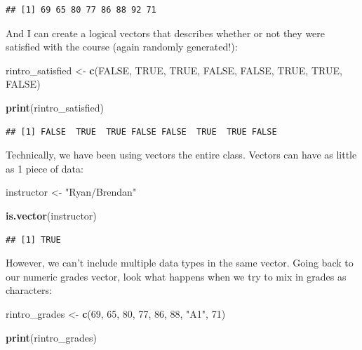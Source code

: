 \documentclass[
]{book}
\newenvironment{Shaded}{\begin{snugshade}}{\end{snugshade}}
\newcommand{\ConstantTok}[1]{\textcolor[rgb]{0.56,0.35,0.01}{#1}}
\newcommand{\DecValTok}[1]{\textcolor[rgb]{0.00,0.00,0.81}{#1}}
\newcommand{\FunctionTok}[1]{\textcolor[rgb]{0.13,0.29,0.53}{\textbf{#1}}}
\newcommand{\NormalTok}[1]{#1}
\newcommand{\OtherTok}[1]{\textcolor[rgb]{0.56,0.35,0.01}{#1}}
\newcommand{\StringTok}[1]{\textcolor[rgb]{0.31,0.60,0.02}{#1}}
\begin{document}
\begin{verbatim}
## [1] 69 65 80 77 86 88 92 71
\end{verbatim}

And I can create a logical vectors that describes whether or not they were satisfied with the course (again randomly generated!):

\begin{Shaded}
\begin{Highlighting}[]
\NormalTok{rintro\_satisfied }\OtherTok{\textless{}{-}} \FunctionTok{c}\NormalTok{(}\ConstantTok{FALSE}\NormalTok{, }\ConstantTok{TRUE}\NormalTok{, }\ConstantTok{TRUE}\NormalTok{, }\ConstantTok{FALSE}\NormalTok{, }\ConstantTok{FALSE}\NormalTok{, }\ConstantTok{TRUE}\NormalTok{, }\ConstantTok{TRUE}\NormalTok{, }\ConstantTok{FALSE}\NormalTok{) }

\FunctionTok{print}\NormalTok{(rintro\_satisfied)}
\end{Highlighting}
\end{Shaded}

\begin{verbatim}
## [1] FALSE  TRUE  TRUE FALSE FALSE  TRUE  TRUE FALSE
\end{verbatim}

Technically, we have been using vectors the entire class. Vectors can have as little as 1 piece of data:

\begin{Shaded}
\begin{Highlighting}[]
\NormalTok{instructor }\OtherTok{\textless{}{-}} \StringTok{"Ryan/Brendan"}

\FunctionTok{is.vector}\NormalTok{(instructor)}
\end{Highlighting}
\end{Shaded}

\begin{verbatim}
## [1] TRUE
\end{verbatim}

However, we can't include multiple data types in the same vector. Going back to our numeric grades vector, look what happens when we try to mix in grades as characters:

\begin{Shaded}
\begin{Highlighting}[]
\NormalTok{rintro\_grades }\OtherTok{\textless{}{-}} \FunctionTok{c}\NormalTok{(}\DecValTok{69}\NormalTok{, }\DecValTok{65}\NormalTok{, }\DecValTok{80}\NormalTok{, }\DecValTok{77}\NormalTok{, }\DecValTok{86}\NormalTok{, }\DecValTok{88}\NormalTok{, }\StringTok{"A1"}\NormalTok{, }\DecValTok{71}\NormalTok{)}


\FunctionTok{print}\NormalTok{(rintro\_grades)}
\end{Highlighting}
\end{Shaded}
\end{document}
